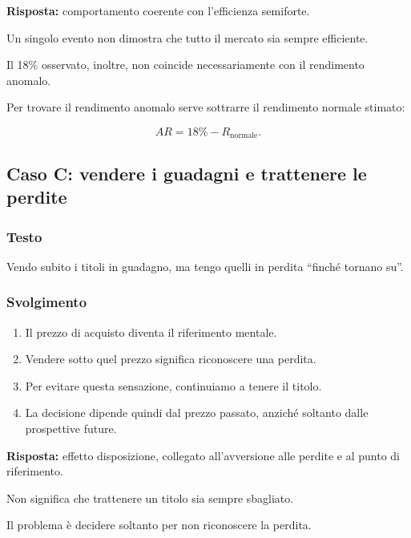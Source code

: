 \noindent \textbf{Risposta:}
comportamento coerente
con l'efficienza semiforte.

\medskip

\noindent Un singolo evento
non dimostra che tutto il mercato
sia sempre efficiente.

\noindent Il 18\% osservato, inoltre,
non coincide necessariamente
con il rendimento anomalo.

\noindent Per trovare il rendimento anomalo
serve sottrarre il rendimento normale stimato:

\[
AR
=
18\%
-
R_{\mathrm{normale}}.
\]


\subsection{Caso C:
vendere i guadagni e trattenere le perdite}

\subsubsection*{Testo}

\noindent Vendo subito i titoli in guadagno,
ma tengo quelli in perdita
``finché tornano su''.


\subsubsection*{Svolgimento}

\begin{enumerate}
    \item Il prezzo di acquisto diventa
    il riferimento mentale.

    \item Vendere sotto quel prezzo
    significa riconoscere una perdita.

    \item Per evitare questa sensazione,
    continuiamo a tenere il titolo.

    \item La decisione dipende quindi
    dal prezzo passato,
    anziché soltanto dalle prospettive future.
\end{enumerate}

\noindent \textbf{Risposta:}
effetto disposizione,
collegato all'avversione alle perdite
e al punto di riferimento.

\medskip

\noindent Non significa che trattenere un titolo
sia sempre sbagliato.

\noindent Il problema è decidere soltanto
per non riconoscere la perdita.


